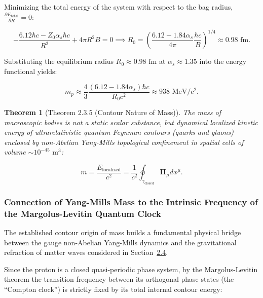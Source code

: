 \documentclass[11pt,a4paper]{article}
\newtheorem{theorem}{Theorem}[section]
\theoremstyle{definition}
\begin{document}
Minimizing the total energy of the system with respect to the bag radius, $\frac{\partial E_{\text{total}}}{\partial R} = 0$:

\begin{equation}\label{eq:2.3.47}\tag{2.3.47}
- \frac{6.12 \hbar c - Z_0 \alpha_s \hbar c}{R^2} + 4\pi R^2 B = 0 \implies R_0 = \left( \frac{6.12 - 1.84 \alpha_s}{4\pi} \frac{\hbar c}{B} \right)^{1/4} \approx 0.98\text{ fm}.
\end{equation}

Substituting the equilibrium radius $R_0 \approx 0.98\text{ fm}$ at $\alpha_s \approx 1.35$ into the energy functional yields:

\begin{equation}\label{eq:2.3.48}\tag{2.3.48}
m_p \approx \frac{4}{3} \frac{(6.12 - 1.84\alpha_s)\hbar c}{R_0 c^2} \approx 938\text{ MeV}/c^2.
\end{equation}

\begin{theorem}[Theorem 2.3.5 (Contour Nature of Mass)]\label{thm:2.3.5}
The mass of macroscopic bodies is not a static scalar substance, but dynamical localized kinetic energy of ultrarelativistic quantum Feynman contours (quarks and gluons) enclosed by non-Abelian Yang-Mills topological confinement in spatial cells of volume $\sim 10^{-45}\text{ m}^3$:

\begin{equation}\label{eq:2.3.49}\tag{2.3.49}
m = \frac{E_{\text{localized}}}{c^2} = \frac{1}{c^2} \oint_{\gamma_{\text{closed}}} \mathbf{\Pi}_\mu dx^\mu.
\end{equation}
\end{theorem}

\subsubsection{Connection of Yang-Mills Mass to the Intrinsic Frequency of the Margolus-Levitin Quantum Clock}\label{sec:2.3.8}

The established contour origin of mass builds a fundamental physical bridge between the gauge non-Abelian Yang-Mills dynamics and the gravitational refraction of matter waves considered in Section~\hyperref[sec:2.4]{2.4}.

Since the proton is a closed quasi-periodic phase system, by the Margolus-Levitin theorem the transition frequency between its orthogonal phase states (the ``Compton clock'') is strictly fixed by its total internal contour energy:
\end{document}
